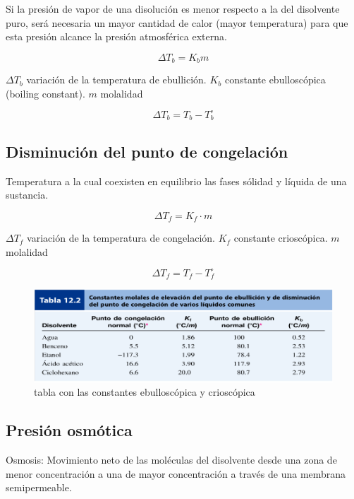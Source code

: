 \documentclass[]{article}
\begin{document}
Si la presión de vapor de una disolución es menor respecto a la del disolvente puro, será necesaria un mayor cantidad de calor (mayor temperatura) para que esta presión alcance la presión atmosférica externa.

\begin{equation}
\Delta T_{b}=K_{b}m
\end{equation}

$\Delta T_{b}$ variación de la temperatura de ebullición. $K_{b}$ constante ebulloscópica (boiling constant). $m$ molalidad

\begin{equation}
\Delta T_{b}=T_{b}-T_{b}^{\circ}
\end{equation}



\subsection{Disminución del punto de congelación}
Temperatura a la cual coexisten en equilibrio las fases sólidad y líquida de una sustancia.

\begin{equation}
\Delta T_{f}=K_{f} \cdot m
\end{equation}

$\Delta T_{f}$ variación de la temperatura de congelación. $K_{f}$ constante crioscópica. $m$ molalidad

\begin{equation}
\Delta T_{f}=T_{f}-T_{f}^{\circ}
\end{equation}

\begin{figure}[H]
\center
\includegraphics[scale=0.4]{foto19.png}
\caption{tabla con las constantes ebulloscópica y crioscópica}
\end{figure}



\subsection{Presión osmótica}
Osmosis: Movimiento neto de las moléculas del disolvente desde una zona de menor concentración a una de mayor concentración a través de una membrana semipermeable.
\end{document}
